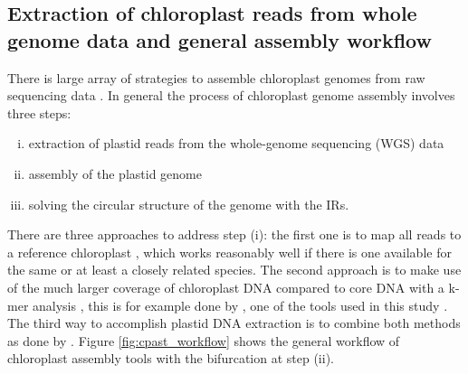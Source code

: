 \subsection{Extraction of chloroplast reads from whole genome data and general assembly workflow}
There is large array of strategies to assemble chloroplast genomes from raw sequencing
data \cite{twyford_strategies_2017}. In general the process of chloroplast genome assembly
involves three steps:
\begin{enumerate}[(i)]
\item extraction of plastid reads from the whole-genome sequencing (WGS) data
\item assembly of the plastid genome
\item solving the circular structure of
the genome with the IRs.
\end{enumerate}
There are three approaches to address step (i): the first one is to map all reads to a
reference chloroplast \cite{Vinga2012}, which works reasonably well if there is one
available for the same or at least a closely related species. The second approach is to
make use of the much larger coverage of chloroplast DNA compared to core DNA with a k-mer
analysis \cite{Chan2013}, this is for example done by \ce \hspace{0.25ex}, one of the tools used in this study
\cite{j_ankenbrand_chloroextractor:_2018}. The third way to accomplish plastid DNA
extraction is to combine both methods as done by \np \hspace{0.25ex}
\cite{dierckxsens_novoplasty:_2017}. Figure \ref{fig:cpast_workflow} shows the general
workflow of chloroplast assembly tools with the bifurcation at step (ii).

